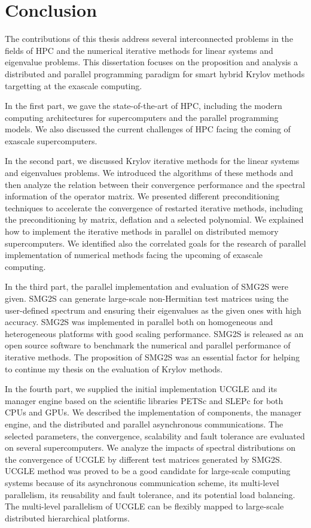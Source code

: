 \section{Conclusion}

The contributions of this thesis address several interconnected problems in the fields of HPC and the numerical iterative methods for linear systems and eigenvalue problems. This dissertation focuses on the proposition and analysis a distributed and parallel programming paradigm for smart hybrid Krylov methods targetting at the exascale computing.

In the first part, we gave the state-of-the-art of HPC, including the modern computing architectures for supercomputers and the parallel programming models. We also discussed the current challenges of HPC facing the coming of exascale supercomputers.

In the second part, we discussed Krylov iterative methods for the linear systems and eigenvalues problems. We introduced the algorithms of these methods and then analyze the relation between their convergence performance and the spectral information of the operator matrix. We presented different preconditioning techniques to accelerate the convergence of restarted iterative methods, including the preconditioning by matrix, deflation and a selected polynomial.  We explained how to implement the iterative methods in parallel on distributed memory supercomputers. We identified also the correlated goals for the research of parallel implementation of numerical methods facing the upcoming of exascale computing.

In the third part, the parallel implementation and evaluation of SMG2S were given. SMG2S can generate large-scale non-Hermitian test matrices using the user-defined spectrum and ensuring their eigenvalues as the given ones with high accuracy. SMG2S was implemented in parallel both on homogeneous and heterogeneous platforms with good scaling performance. SMG2S is released as an open source software to benchmark the numerical and parallel performance of iterative methods. The proposition of SMG2S was an essential factor for helping to continue my thesis on the evaluation of Krylov methods.

In the fourth part, we supplied the initial implementation UCGLE and its manager engine based on the scientific libraries PETSc and SLEPc for both CPUs and GPUs. We described the implementation of components, the manager engine, and the distributed and parallel asynchronous communications. The selected parameters, the convergence, scalability and fault tolerance are evaluated on several supercomputers. We analyze the impacts of spectral distributions on the convergence of UCGLE by different test matrices generated by SMG2S. UCGLE method was proved to be a good candidate for large-scale computing systems because of its asynchronous communication scheme, its multi-level parallelism, its reusability and fault tolerance, and its potential load balancing. The multi-level parallelism of UCGLE can be flexibly mapped to large-scale distributed hierarchical platforms.

